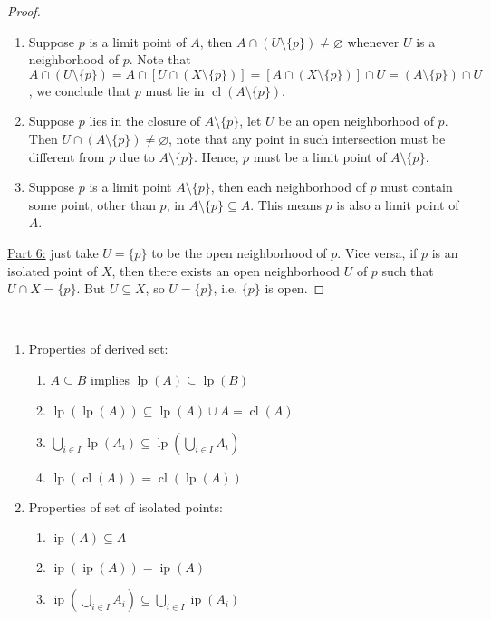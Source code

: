 \documentclass{treatise}
\begin{document}
\begin{proof}
\begin{enumerate}
    \item Suppose $p$ is a limit point of $A$, then $A \cap (U \setminus \{ p \}) \neq \varnothing$ whenever $U$ is a neighborhood of $p$. Note that $A \cap (U \setminus \{ p \}) = A \cap [U \cap (X \setminus \{ p \})] = [A \cap (X \setminus \{ p \})] \cap U = (A \setminus \{ p \}) \cap U$, we conclude that $p$ must lie in $\operatorname{cl}(A \setminus \{ p \})$.
    \item Suppose $p$ lies in the closure of $A \setminus \{ p \}$, let $U$ be an open neighborhood of $p$. Then $U \cap (A \setminus \{ p \}) \neq \varnothing$, note that any point in such intersection must be different from $p$ due to $A \setminus \{ p \}$. Hence, $p$ must be a limit point of $A \setminus \{ p \}$.
    \item Suppose $p$ is a limit point $A \setminus \{ p \}$, then each neighborhood of $p$ must contain some point, other than $p$, in $A \setminus \{ p \} \subseteq A$. This means $p$ is also a limit point of $A$.
\end{enumerate}
\underline{Part 6:} just take $U = \{ p \}$ to be the open neighborhood of $p$. Vice versa, if $p$ is an isolated point of $X$, then there exists an open neighborhood $U$ of $p$ such that $U \cap X = \{ p \}$. But $U \subseteq X$, so $U = \{ p \}$, i.e. $\{ p \}$ is open.
\end{proof}
\begin{proposition} \label{lim-iso-lat-prop} \ 
\begin{enumerate}
    \item Properties of derived set:
    \begin{enumerate}
        \item $A \subseteq B$ implies $\operatorname{lp}(A) \subseteq \operatorname{lp}(B)$
        \item $\operatorname{lp}(\operatorname{lp}(A)) \subseteq \operatorname{lp}(A) \cup A = \operatorname{cl}(A)$
        \item $\bigcup_{i \in I} \operatorname{lp} (A_i) \subseteq \operatorname{lp} \left( \bigcup_{i \in I} A_i \right)$
        \item $\operatorname{lp}(\operatorname{cl}(A)) = \operatorname{cl}(\operatorname{lp}(A))$
    \end{enumerate}
    \item Properties of set of isolated points:
    \begin{enumerate}
        \item $\operatorname{ip}(A) \subseteq A$
        \item $\operatorname{ip}(\operatorname{ip}(A)) = \operatorname{ip}(A)$
        \item $\operatorname{ip} \left( \bigcup_{i \in I} A_i \right) \subseteq \bigcup_{i \in I} \operatorname{ip}(A_i)$ 
    \end{enumerate}
\end{enumerate}
\end{proposition}
\end{document}
